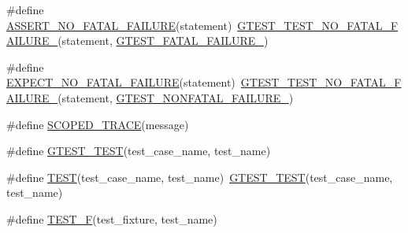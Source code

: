 \begin{DoxyCompactItemize}
\#define \hyperlink{fused-src_2gtest_2gtest_8h_a5034fda3490aad5a93942ac83f4cea49}{A\-S\-S\-E\-R\-T\-\_\-\-N\-O\-\_\-\-F\-A\-T\-A\-L\-\_\-\-F\-A\-I\-L\-U\-R\-E}(statement)~\hyperlink{gtest-internal_8h_a1b37a3c446836d33040f3266a6236081}{G\-T\-E\-S\-T\-\_\-\-T\-E\-S\-T\-\_\-\-N\-O\-\_\-\-F\-A\-T\-A\-L\-\_\-\-F\-A\-I\-L\-U\-R\-E\-\_\-}(statement, \hyperlink{gtest-internal_8h_a0f9a4c3ea82cc7bf4478eaffdc168358}{G\-T\-E\-S\-T\-\_\-\-F\-A\-T\-A\-L\-\_\-\-F\-A\-I\-L\-U\-R\-E\-\_\-})
\item 
\#define \hyperlink{fused-src_2gtest_2gtest_8h_a067c02ccaf3171d6e1781cd0f8cdcf74}{E\-X\-P\-E\-C\-T\-\_\-\-N\-O\-\_\-\-F\-A\-T\-A\-L\-\_\-\-F\-A\-I\-L\-U\-R\-E}(statement)~\hyperlink{gtest-internal_8h_a1b37a3c446836d33040f3266a6236081}{G\-T\-E\-S\-T\-\_\-\-T\-E\-S\-T\-\_\-\-N\-O\-\_\-\-F\-A\-T\-A\-L\-\_\-\-F\-A\-I\-L\-U\-R\-E\-\_\-}(statement, \hyperlink{gtest-internal_8h_a6cb7482cfa03661a91c698eb5895f642}{G\-T\-E\-S\-T\-\_\-\-N\-O\-N\-F\-A\-T\-A\-L\-\_\-\-F\-A\-I\-L\-U\-R\-E\-\_\-})
\item 
\#define \hyperlink{fused-src_2gtest_2gtest_8h_a4dac08f15adc8cb1ee0e5c1bfb0f440d}{S\-C\-O\-P\-E\-D\-\_\-\-T\-R\-A\-C\-E}(message)
\item 
\#define \hyperlink{fused-src_2gtest_2gtest_8h_a725b565bedc3a34dc109901854214cc4}{G\-T\-E\-S\-T\-\_\-\-T\-E\-S\-T}(test\-\_\-case\-\_\-name, test\-\_\-name)
\item 
\#define \hyperlink{fused-src_2gtest_2gtest_8h_ad8b332753515c0ab8baada563c2547eb}{T\-E\-S\-T}(test\-\_\-case\-\_\-name, test\-\_\-name)~\hyperlink{gtest__unittest_8cc_a54247aeadc0617105812dca8609638de}{G\-T\-E\-S\-T\-\_\-\-T\-E\-S\-T}(test\-\_\-case\-\_\-name, test\-\_\-name)
\item 
\#define \hyperlink{fused-src_2gtest_2gtest_8h_a0ee66d464d1a06c20c1929cae09d8758}{T\-E\-S\-T\-\_\-\-F}(test\-\_\-fixture, test\-\_\-name)
\end{DoxyCompactItemize}
